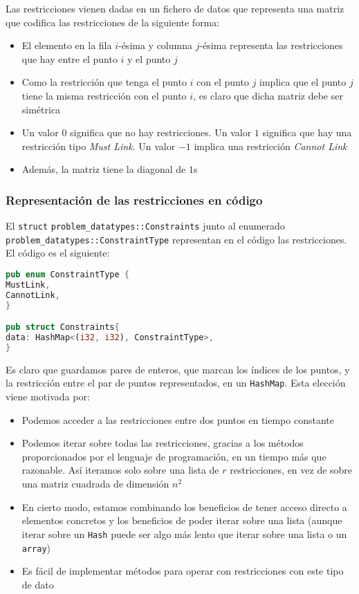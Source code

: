 \documentclass[11pt]{article}
\begin{document}
Las restricciones vienen dadas en un fichero de datos que representa una matriz que codifica las restricciones de la siguiente forma:

\begin{itemize}
\item El elemento en la fila $i$-ésima y columna $j$-ésima representa las restricciones que hay entre el punto $i$ y el punto $j$
\item Como la restricción que tenga el punto $i$ con el punto $j$ implica que el punto $j$ tiene la misma restricción con el punto $i$, es claro que dicha matriz debe ser simétrica
\item Un valor $0$ significa que no hay restricciones. Un valor $1$ significa que hay una restricción tipo \emph{Must Link}. Un valor $-1$ implica una restricción \emph{Cannot Link}
\item Además, la matriz tiene la diagonal de $1$s
\end{itemize}

\subsubsection{Representación de las restricciones en código}

El \lstinline{struct} \lstinline{problem_datatypes::Constraints} junto al enumerado \lstinline{problem_datatypes::ConstraintType} representan en el código las restricciones. El código es el siguiente:

\begin{lstlisting}[language=Rust, style=Boxed]
pub enum ConstraintType {
MustLink,
CannotLink,
}

pub struct Constraints{
data: HashMap<(i32, i32), ConstraintType>,
}
\end{lstlisting}

Es claro que guardamos pares de enteros, que marcan los índices de los puntos, y la restricción entre el par de puntos representados, en un \lstinline{HashMap}. Esta elección viene motivada por:

\begin{itemize}
\item Podemos acceder a las restricciones entre dos puntos en tiempo constante
\item Podemos iterar sobre todas las restricciones, gracias a los métodos proporcionados por el lenguaje de programación, en un tiempo más que razonable. Así iteramos solo sobre una lista de $r$ restricciones, en vez de sobre una matriz cuadrada de dimensión $n^2$
\item En cierto modo, estamos combinando los beneficios de tener acceso directo a elementos concretos y los beneficios de poder iterar sobre una lista (aunque iterar sobre un \lstinline{Hash} puede ser algo más lento que iterar sobre una lista o un \lstinline{array})
\item Es fácil de implementar métodos para operar con restricciones con este tipo de dato
\end{itemize}
\end{document}
